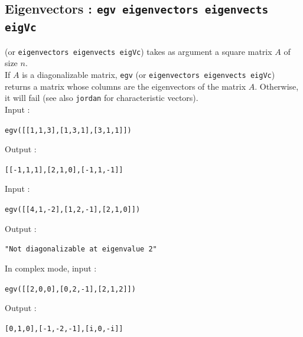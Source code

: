 \documentclass[a4paper,11pt]{book}
\begin{document}
\subsection{Eigenvectors : {\tt egv eigenvectors eigenvects
eigVc}}
 (or {\tt eigenvectors eigenvects eigVc}) takes as argument 
a square matrix $A$ of size $n$.\\
If $A$ is a diagonalizable matrix, {\tt egv} (or 
{\tt eigenvectors eigenvects eigVc}) returns a matrix whose columns are the 
eigenvectors of the matrix $A$. Otherwise, it will fail (see also
{\tt jordan} for characteristic vectors).\\ 
Input :
\begin{center}{\tt egv([[1,1,3],[1,3,1],[3,1,1]])}\end{center}
Output :
\begin{center}{\tt [[-1,1,1],[2,1,0],[-1,1,-1]] }\end{center}
Input :
\begin{center}{\tt egv([[4,1,-2],[1,2,-1],[2,1,0]])}\end{center}
Output :
\begin{center}{\tt "Not diagonalizable at eigenvalue 2"}\end{center}
In complex mode, input :
\begin{center}{\tt egv([[2,0,0],[0,2,-1],[2,1,2]])}\end{center}
Output :
\begin{center}{\tt [0,1,0],[-1,-2,-1],[i,0,-i]]}\end{center}
\end{document}
